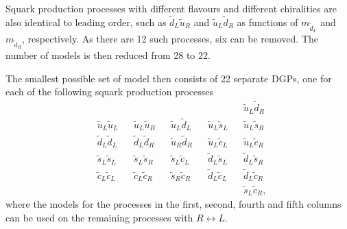 \documentclass[twoside,english]{uiofysmaster}
\begin{document}
{{%

Squark production processes with different flavours and different chiralities are also identical to leading order, such as $\widetilde{d}_L \widetilde{u}_R$ and $\widetilde{u}_L \widetilde{d}_R$ as functions of $m_{\widetilde{d}_L}$ and $m_{\widetilde{d}_R}$, respectively. As there are 12 such processes, six can be removed. The number of models is then reduced from 28 to 22. 

The smallest possible set of model then consists of 22 separate DGPs, one for each of the following squark production processes
\begin{align*}
& && && && && \widetilde{u}_L \widetilde{d}_R\\ 
& \widetilde{u}_L \widetilde{u}_L && \widetilde{u}_L \widetilde{u}_R && \widetilde{u}_L \widetilde{d}_L && \widetilde{u}_L \widetilde{s}_L && \widetilde{u}_L \widetilde{s}_R\\
& \widetilde{d}_L \widetilde{d}_L && \widetilde{d}_L \widetilde{d}_R && \widetilde{u}_R \widetilde{d}_R && \widetilde{u}_L \widetilde{c}_L && \widetilde{u}_L \widetilde{c}_R\\ 
& \widetilde{s}_L \widetilde{s}_L && \widetilde{s}_L \widetilde{s}_R && \widetilde{s}_L \widetilde{c}_L && \widetilde{d}_L \widetilde{s}_L && \widetilde{d}_L \widetilde{s}_R\\
& \widetilde{c}_L \widetilde{c}_L && \widetilde{c}_L \widetilde{c}_R && \widetilde{s}_R \widetilde{c}_R && \widetilde{d}_L \widetilde{c}_L && \widetilde{d}_L \widetilde{c}_R \\
&  &&  &&  && && \widetilde{s}_L \widetilde{c}_R,
\end{align*}
where the models for the processes in the first, second, fourth and fifth columns can be used on the remaining processes with $R \leftrightarrow L$.




}}
\end{document}

